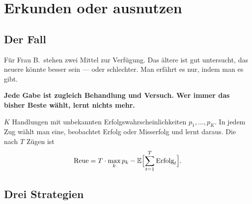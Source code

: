 \chapter{Erkunden oder ausnutzen}

\section{Der Fall}

\begin{merksatz}
Für Frau B.\ stehen zwei Mittel zur Verfügung. Das ältere ist gut untersucht, das neuere könnte besser sein --- oder schlechter. Man erfährt es nur, indem man es gibt.

\begin{center}
\begin{minipage}{0.9\textwidth}
\textbf{Jede Gabe ist zugleich Behandlung und Versuch. Wer immer das bisher Beste wählt, lernt nichts mehr.}
\end{minipage}
\end{center}

\begin{center}
\begin{minipage}{0.88\textwidth}
\end{minipage}
\end{center}
\end{merksatz}

\begin{definition}
$K$ Handlungen mit unbekannten Erfolgswahrscheinlichkeiten $p_1,\ldots,p_K$. In jedem Zug wählt man eine, beobachtet Erfolg oder Misserfolg und lernt daraus. Die  nach $T$ Zügen ist
\[ \text{Reue} = T\cdot\max_k p_k - \mathbb{E}\Bigl[\sum_{t=1}^{T} \text{Erfolg}_t\Bigr] . \]
\end{definition}

\section{Drei Strategien}

